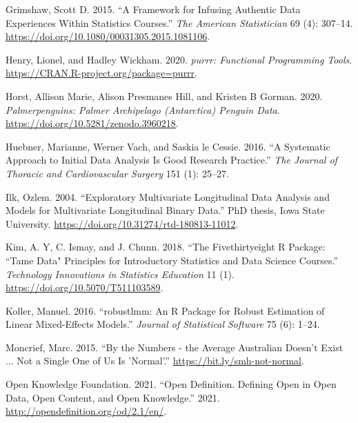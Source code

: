 \documentclass{article}
\newlength{\cslhangindent}
\newlength{\cslentryspacingunit} %
\newenvironment{CSLReferences}[2] %
 {%
  \setlength{\parindent}{0pt}
  \ifodd #1
  \let\oldpar\par
  \def\par{\hangindent=\cslhangindent\oldpar}
  \fi
  \setlength{\parskip}{#2\cslentryspacingunit}
 }%
 {}
\begin{document}
\begin{CSLReferences}{1}{0}
\leavevmode{}%
Grimshaw, Scott D. 2015. {``A Framework for Infusing Authentic Data Experiences Within Statistics Courses.''} \emph{The American Statistician} 69 (4): 307--14. \url{https://doi.org/10.1080/00031305.2015.1081106}.

\leavevmode{}%
Henry, Lionel, and Hadley Wickham. 2020. \emph{{purrr: Functional Programming Tools}}. \url{https://CRAN.R-project.org/package=purrr}.

\leavevmode{}%
Horst, Allison Marie, Alison Presmanes Hill, and Kristen B Gorman. 2020. \emph{Palmerpenguins: Palmer Archipelago (Antarctica) Penguin Data}. \url{https://doi.org/10.5281/zenodo.3960218}.

\leavevmode{}%
Huebner, Marianne, Werner Vach, and Saskia le Cessie. 2016. {``A Systematic Approach to Initial Data Analysis Is Good Research Practice.''} \emph{The Journal of Thoracic and Cardiovascular Surgery} 151 (1): 25--27.

\leavevmode{}%
Ilk, Ozlem. 2004. {``Exploratory Multivariate Longitudinal Data Analysis and Models for Multivariate Longitudinal Binary Data.''} PhD thesis, Iowa State University. \url{https://doi.org/10.31274/rtd-180813-11012}.

\leavevmode{}%
Kim, A. Y, C. Ismay, and J. Chunn. 2018. {``The Fivethirtyeight {R} Package: ``Tame Data" Principles for Introductory Statistics and Data Science Courses.''} \emph{Technology Innovations in Statistics Education} 11 (1). \url{https://doi.org/10.5070/T511103589}.

\leavevmode{}%
Koller, Manuel. 2016. {``{robustlmm: An R Package for Robust Estimation of Linear Mixed-Effects Models}.''} \emph{Journal of Statistical Software} 75 (6): 1--24.

\leavevmode{}%
Moncrief, Marc. 2015. {``By the Numbers - the Average Australian Doesn't Exist ... Not a Single One of Us Is 'Normal'.''} \url{https://bit.ly/smh-not-normal}.

\leavevmode{}%
Open Knowledge Foundation. 2021. {``Open Definition. Defining Open in Open Data, Open Content, and Open Knowledge.''} 2021. \url{http://opendefinition.org/od/2.1/en/}.


\end{CSLReferences}
\end{document}
